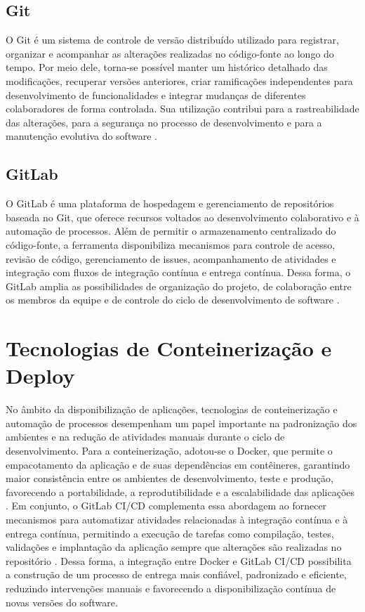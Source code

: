 \subsection{Git}
O Git é um sistema de controle de versão distribuído utilizado para registrar, organizar e acompanhar as alterações realizadas no código-fonte ao longo do tempo. Por meio dele, torna-se possível manter um histórico detalhado das modificações, recuperar versões anteriores, criar ramificações independentes para desenvolvimento de funcionalidades e integrar mudanças de diferentes colaboradores de forma controlada. Sua utilização contribui para a rastreabilidade das alterações, para a segurança no processo de desenvolvimento e para a manutenção evolutiva do software \cite{chacon2014}.

\subsection{GitLab}
O GitLab é uma plataforma de hospedagem e gerenciamento de repositórios baseada no Git, que oferece recursos voltados ao desenvolvimento colaborativo e à automação de processos. Além de permitir o armazenamento centralizado do código-fonte, a ferramenta disponibiliza mecanismos para controle de acesso, revisão de código, gerenciamento de issues, acompanhamento de atividades e integração com fluxos de integração contínua e entrega contínua. Dessa forma, o GitLab amplia as possibilidades de organização do projeto, de colaboração entre os membros da equipe e de controle do ciclo de desenvolvimento de software \cite{gitlab2026}.

\section{Tecnologias de Conteinerização e Deploy}
No âmbito da disponibilização de aplicações, tecnologias de conteinerização e automação de processos desempenham um papel importante na padronização dos ambientes e na redução de atividades manuais durante o ciclo de desenvolvimento. Para a conteinerização, adotou-se o Docker, que permite o empacotamento da aplicação e de suas dependências em contêineres, garantindo maior consistência entre os ambientes de desenvolvimento, teste e produção, favorecendo a portabilidade, a reprodutibilidade e a escalabilidade das aplicações \cite{docker2026}. Em conjunto, o GitLab CI/CD complementa essa abordagem ao fornecer mecanismos para automatizar atividades relacionadas à integração contínua e à entrega contínua, permitindo a execução de tarefas como compilação, testes, validações e implantação da aplicação sempre que alterações são realizadas no repositório \cite{gitlabcicd2026}. Dessa forma, a integração entre Docker e GitLab CI/CD possibilita a construção de um processo de entrega mais confiável, padronizado e eficiente, reduzindo intervenções manuais e favorecendo a disponibilização contínua de novas versões do software.

